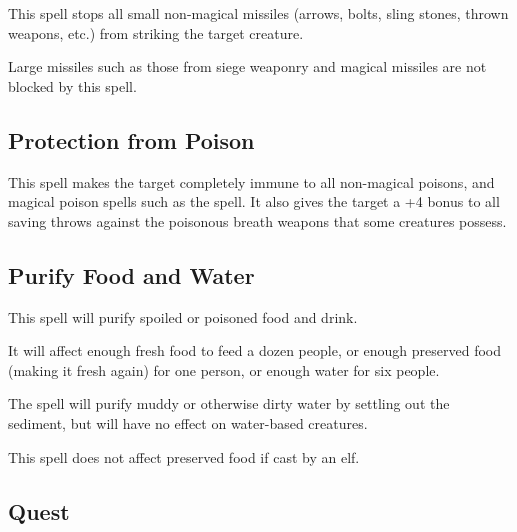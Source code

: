 \begin{multicols*}{2}
This spell stops all small non-magical missiles (arrows, bolts, sling stones, thrown weapons, etc.) from striking the target creature.

Large missiles such as those from siege weaponry and magical missiles are not blocked by this spell.

\subsection{Protection from Poison}\label{spell:Protection from Poison}

This spell makes the target completely immune to all non-magical poisons, and magical poison spells such as the  spell. It also gives the target a +4 bonus to all saving throws against the poisonous breath weapons that some creatures possess.

\subsection{Purify Food and Water}\label{spell:Purify Food and Water}

This spell will purify spoiled or poisoned food and drink.

It will affect enough fresh food to feed a dozen people, or enough preserved food (making it fresh again) for one person, or enough water for six people.

The spell will purify muddy or otherwise dirty water by settling out the sediment, but will have no effect on water-based creatures.

This spell does not affect preserved food if cast by an elf.

\subsection{Quest}\label{spell:Quest}
\end{multicols*}
